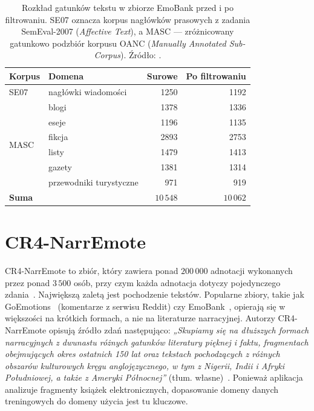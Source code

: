 \begin{table}[htbp]
  \centering
  \caption[Rozkład gatunków w zbiorze EmoBank]{Rozkład gatunków tekstu w zbiorze
          EmoBank przed i po filtrowaniu. SE07 oznacza korpus nagłówków prasowych
          z zadania SemEval-2007 (\textit{Affective Text}), a MASC --- zróżnicowany
          gatunkowo podzbiór korpusu OANC (\textit{Manually Annotated Sub-Corpus}).
          Źródło: \cite{buechel-hahn-2017-emobank}.}
  \label{tab:emobank_genres}
  \begin{tabular}{llrr}
    \toprule
    Korpus & Domena & Surowe & Po filtrowaniu \\
    \midrule
    SE07 & nagłówki wiadomości & 1250 & 1192 \\
    \midrule
    \multirow{6}{*}{MASC} & blogi & 1378 & 1336 \\
     & eseje & 1196 & 1135 \\
     & fikcja & 2893 & 2753 \\
     & listy & 1479 & 1413 \\
     & gazety & 1381 & 1314 \\
     & przewodniki turystyczne & 971 & 919 \\
    \midrule
    \multicolumn{2}{l}{\textbf{Suma}} & \textbf{$10\,548$} & \textbf{$10\,062$} \\
    \bottomrule
  \end{tabular}
\end{table}

\FloatBarrier
\section{CR4-NarrEmote}
CR4-NarrEmote to zbiór, który zawiera ponad $200\,000$ adnotacji wykonanych przez ponad $3\,500$ 
osób, przy czym każda adnotacja dotyczy pojedynczego zdania~\cite{piper-budac-2025-cr4}. Największą
zaletą jest pochodzenie tekstów. Popularne
zbiory, takie jak GoEmotions~\cite{GoEmotions} (komentarze z serwisu Reddit) czy
EmoBank~\cite{buechel-hahn-2017-emobank}, opierają się w większości na krótkich formach, a nie
na literaturze narracyjnej. Autorzy CR4-NarrEmote opisują źródło zdań następująco: \textit{„Skupiamy
się na dłuższych formach narracyjnych z dwunastu różnych gatunków literatury pięknej i faktu,
fragmentach obejmujących okres ostatnich 150 lat oraz tekstach pochodzących z różnych obszarów
kulturowych kręgu anglojęzycznego, w tym z Nigerii, Indii i Afryki Południowej, a także z Ameryki
Północnej”} (tłum. własne)~\cite[s.~9774]{piper-budac-2025-cr4}. Ponieważ aplikacja analizuje
fragmenty książek elektronicznych, dopasowanie domeny danych treningowych do
domeny użycia jest tu kluczowe.

